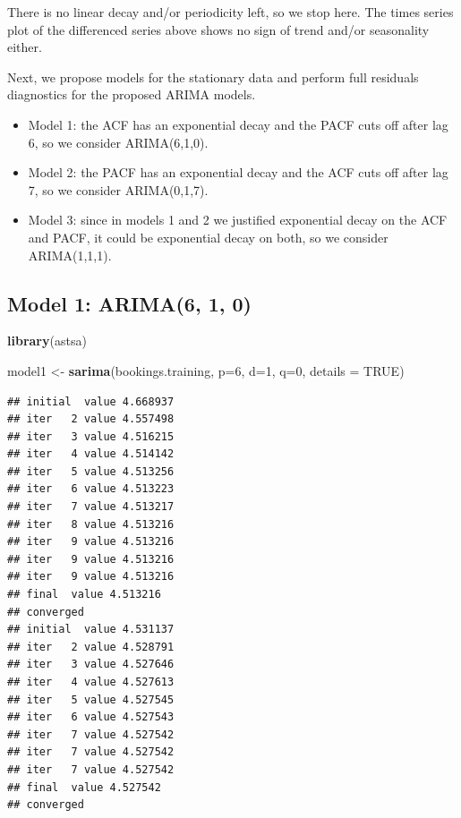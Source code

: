 \documentclass[]{article}
\newenvironment{Shaded}{\begin{snugshade}}{\end{snugshade}}
\newcommand{\DataTypeTok}[1]{\textcolor[rgb]{0.13,0.29,0.53}{#1}}
\newcommand{\DecValTok}[1]{\textcolor[rgb]{0.00,0.00,0.81}{#1}}
\newcommand{\KeywordTok}[1]{\textcolor[rgb]{0.13,0.29,0.53}{\textbf{#1}}}
\newcommand{\NormalTok}[1]{#1}
\newcommand{\OtherTok}[1]{\textcolor[rgb]{0.56,0.35,0.01}{#1}}
\newcommand{\StringTok}[1]{\textcolor[rgb]{0.31,0.60,0.02}{#1}}
\providecommand{\tightlist}{%
  \setlength{\itemsep}{0pt}\setlength{\parskip}{0pt}}
\begin{document}
There is no linear decay and/or periodicity left, so we stop here. The
times series plot of the differenced series above shows no sign of trend
and/or seasonality either.

Next, we propose models for the stationary data and perform full
residuals diagnostics for the proposed ARIMA models.

\begin{itemize}
\tightlist
\item
  Model 1: the ACF has an exponential decay and the PACF cuts off after
  lag 6, so we consider ARIMA(6,1,0).
\item
  Model 2: the PACF has an exponential decay and the ACF cuts off after
  lag 7, so we consider ARIMA(0,1,7).
\item
  Model 3: since in models 1 and 2 we justified exponential decay on the
  ACF and PACF, it could be exponential decay on both, so we consider
  ARIMA(1,1,1).
\end{itemize}

\newpage

\hypertarget{model-1-arima6-1-0}{%
\subsection{Model 1: ARIMA(6, 1, 0)}\label{model-1-arima6-1-0}}

\begin{Shaded}
\begin{Highlighting}[]
\KeywordTok{library}\NormalTok{(astsa)}

\NormalTok{model1 <-}\StringTok{ }\KeywordTok{sarima}\NormalTok{(bookings.training, }\DataTypeTok{p=}\DecValTok{6}\NormalTok{, }\DataTypeTok{d=}\DecValTok{1}\NormalTok{, }\DataTypeTok{q=}\DecValTok{0}\NormalTok{, }\DataTypeTok{details =} \OtherTok{TRUE}\NormalTok{)}
\end{Highlighting}
\end{Shaded}

\begin{verbatim}
## initial  value 4.668937 
## iter   2 value 4.557498
## iter   3 value 4.516215
## iter   4 value 4.514142
## iter   5 value 4.513256
## iter   6 value 4.513223
## iter   7 value 4.513217
## iter   8 value 4.513216
## iter   9 value 4.513216
## iter   9 value 4.513216
## iter   9 value 4.513216
## final  value 4.513216 
## converged
## initial  value 4.531137 
## iter   2 value 4.528791
## iter   3 value 4.527646
## iter   4 value 4.527613
## iter   5 value 4.527545
## iter   6 value 4.527543
## iter   7 value 4.527542
## iter   7 value 4.527542
## iter   7 value 4.527542
## final  value 4.527542 
## converged
\end{verbatim}
\end{document}
